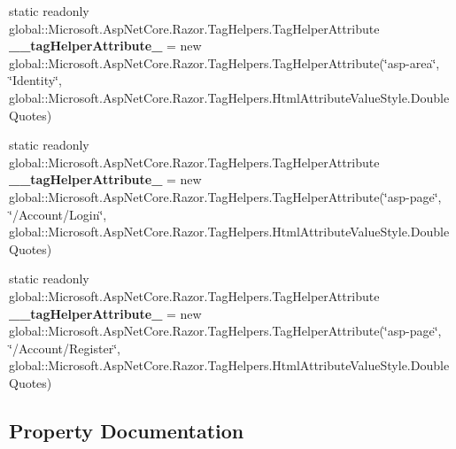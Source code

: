 \begin{DoxyCompactItemize}
\item 
\mbox{\label{class_asp_net_core_1_1_views___shared_____layout_a18716cf9888c732b86d56de5cc78fbc6}} 
static readonly global\+::\+Microsoft.\+Asp\+Net\+Core.\+Razor.\+Tag\+Helpers.\+Tag\+Helper\+Attribute {\bfseries \+\_\+\+\_\+tag\+Helper\+Attribute\+\_} = new global\+::\+Microsoft.\+Asp\+Net\+Core.\+Razor.\+Tag\+Helpers.\+Tag\+Helper\+Attribute(\char`\"{}asp-\/area\char`\"{}, \char`\"{}Identity\char`\"{}, global\+::\+Microsoft.\+Asp\+Net\+Core.\+Razor.\+Tag\+Helpers.\+Html\+Attribute\+Value\+Style.\+Double\+Quotes)
\item 
\mbox{\label{class_asp_net_core_1_1_views___shared_____layout_afc5c8de692eb53c314616a9b98509e66}} 
static readonly global\+::\+Microsoft.\+Asp\+Net\+Core.\+Razor.\+Tag\+Helpers.\+Tag\+Helper\+Attribute {\bfseries \+\_\+\+\_\+tag\+Helper\+Attribute\+\_} = new global\+::\+Microsoft.\+Asp\+Net\+Core.\+Razor.\+Tag\+Helpers.\+Tag\+Helper\+Attribute(\char`\"{}asp-\/page\char`\"{}, \char`\"{}/Account/Login\char`\"{}, global\+::\+Microsoft.\+Asp\+Net\+Core.\+Razor.\+Tag\+Helpers.\+Html\+Attribute\+Value\+Style.\+Double\+Quotes)
\item 
\mbox{\label{class_asp_net_core_1_1_views___shared_____layout_ab10819eaa4d40ecec4816393d5459e5b}} 
static readonly global\+::\+Microsoft.\+Asp\+Net\+Core.\+Razor.\+Tag\+Helpers.\+Tag\+Helper\+Attribute {\bfseries \+\_\+\+\_\+tag\+Helper\+Attribute\+\_} = new global\+::\+Microsoft.\+Asp\+Net\+Core.\+Razor.\+Tag\+Helpers.\+Tag\+Helper\+Attribute(\char`\"{}asp-\/page\char`\"{}, \char`\"{}/Account/Register\char`\"{}, global\+::\+Microsoft.\+Asp\+Net\+Core.\+Razor.\+Tag\+Helpers.\+Html\+Attribute\+Value\+Style.\+Double\+Quotes)
\end{DoxyCompactItemize}


\subsection{Property Documentation}
\mbox{\label{class_asp_net_core_1_1_views___shared_____layout_a41a814a0d95da3b115ba3a5f5541185a}} 
